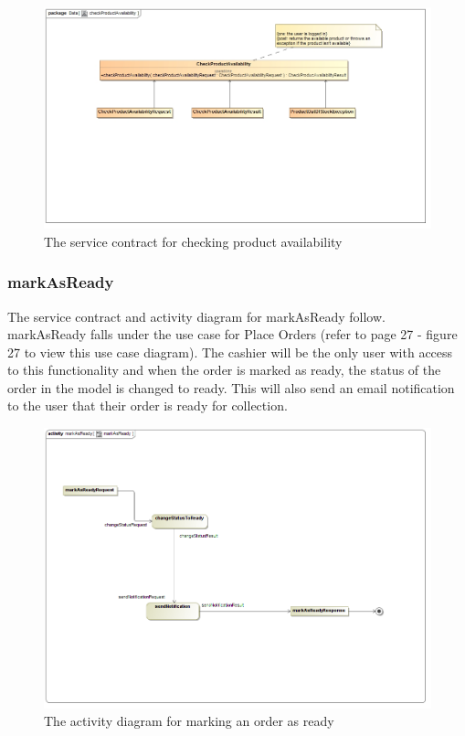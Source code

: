 \documentclass[a4paper,12pt]{report}
\begin{document}
\begin{figure}[H]
	\centering
	\includegraphics[width=1.0\textwidth]{../images/checkProductAvailabilitySC.jpg}
	\caption{The service contract for checking product availability}
\end{figure}

\subsubsection{markAsReady}
The service contract and activity diagram for markAsReady follow. markAsReady falls under the use case for Place Orders (refer to page 27 - figure 27 to view this use case diagram). The cashier will be the only user with access to this functionality and when the order is marked as ready, the status of the order in the model is changed to ready. This will also send an email notification to the user that their order is ready for collection. 
\begin{figure}[H]
  \centering
    \includegraphics[width=1.0\textwidth]{../images/markAsReadyActivity.png}
    \caption{The activity diagram for marking an order as ready } 
\end{figure}
 
\end{document}
